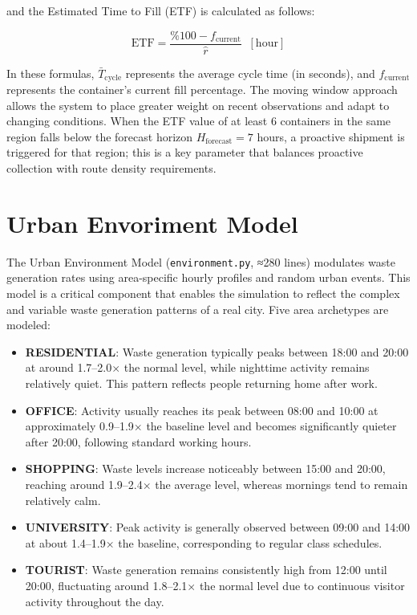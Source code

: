 \documentclass[12pt,a4paper]{report}
\begin{document}
\indent and the Estimated Time to Fill (ETF) is calculated as follows:

\begin{equation}
  \text{ETF} = \frac{\%100 - f_{\text{current}}}{\hat{r}}\;\; [\text{hour}]
  \label{eq:etf}
\end{equation}

\indent In these formulas, $\bar{T}_{\text{cycle}}$ represents the average cycle time (in seconds), and $f_{\text{current}}$ represents the container’s current fill percentage. The moving window approach allows the system to place greater weight on recent observations and adapt to changing conditions. When the ETF value of at least 6 containers in the same region falls below the forecast horizon $H_{\text{forecast}} = 7$ hours, a proactive shipment is triggered for that region; this is a key parameter that balances proactive collection with route density requirements.

\section{Urban Envoriment Model}

\indent The Urban Environment Model (\texttt{environment.py}, ≈280 lines) modulates waste generation rates using area-specific hourly profiles and random urban events. This model is a critical component that enables the simulation to reflect the complex and variable waste generation patterns of a real city. Five area archetypes are modeled:

\begin{itemize}[leftmargin=1.5cm]
  \item \textbf{RESIDENTIAL}: Waste generation typically peaks between 18:00 and 20:00 at around 1.7--2.0$\times$ the normal level, while nighttime activity remains relatively quiet. This pattern reflects people returning home after work.

  \item \textbf{OFFICE}: Activity usually reaches its peak between 08:00 and 10:00 at approximately 0.9--1.9$\times$ the baseline level and becomes significantly quieter after 20:00, following standard working hours.

  \item \textbf{SHOPPING}: Waste levels increase noticeably between 15:00 and 20:00, reaching around 1.9--2.4$\times$ the average level, whereas mornings tend to remain relatively calm.

  \item \textbf{UNIVERSITY}: Peak activity is generally observed between 09:00 and 14:00 at about 1.4--1.9$\times$ the baseline, corresponding to regular class schedules.

  \item \textbf{TOURIST}: Waste generation remains consistently high from 12:00 until 20:00, fluctuating around 1.8--2.1$\times$ the normal level due to continuous visitor activity throughout the day.
\end{itemize}
\end{document}
